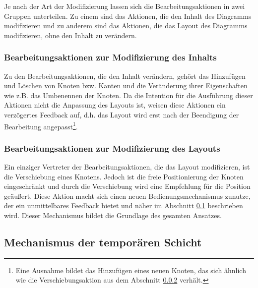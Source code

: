 Je nach der Art der Modifizierung lassen sich die Bearbeitungsaktionen in zwei Gruppen unterteilen. Zu einem sind das Aktionen, die den Inhalt des Diagramms modifizieren und zu anderem sind das Aktionen, die das Layout des Diagramms modifizieren, ohne den Inhalt zu verändern.

\subsubsection{Bearbeitungsaktionen zur Modifizierung des Inhalts}

Zu den Bearbeitungsaktionen, die den Inhalt verändern, gehört das Hinzufügen und Löschen von Knoten bzw. Kanten und die Veränderung ihrer Eigenschaften wie z.B. das Umbenennen der Knoten. Da die Intention für die Ausführung dieser Aktionen nicht die Anpassung des Layouts ist, weisen diese Aktionen ein verzögertes Feedback auf, d.h. das Layout wird erst nach der Beendigung der Bearbeitung angepasst\footnote{Eine Ausnahme bildet das Hinzufügen eines neuen Knoten, das sich ähnlich wie die Verschiebungsaktion aus dem Abschnitt \ref{subsubsec:edit-action-for-modifying-layout} verhält.}.

\subsubsection{Bearbeitungsaktionen zur Modifizierung des Layouts}
\label{subsubsec:edit-action-for-modifying-layout}

Ein einziger Vertreter der Bearbeitungsaktionen, die das Layout modifizieren, ist die Verschiebung eines Knotens. Jedoch ist die freie Positionierung der Knoten eingeschränkt und durch die Verschiebung wird eine Empfehlung für die Position geäußert. Diese Aktion macht sich einen neuen Bedienungsmechanismus zunutze, der ein unmittelbares Feedback bietet und näher im Abschnitt \ref{subsec:temporary-layer-mechanism} beschrieben wird. Dieser Mechanismus bildet die Grundlage des gesamten Ansatzes.

\subsection{Mechanismus der temporären Schicht}
\label{subsec:temporary-layer-mechanism}

